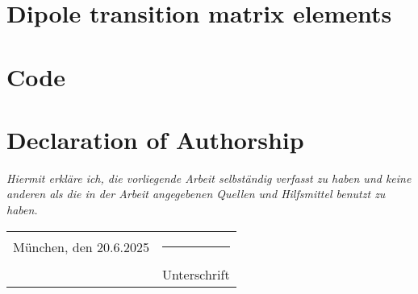 \documentclass[12pt, twoside]{report}
\begin{document}
\chapter{Dipole transition matrix elements}

\cleardoublepage


% 


% 


\chapter{Code}

\cleardoublepage




\cleardoublepage


\chapter*{Declaration of Authorship}
\emph{Hiermit erkläre ich, die vorliegende Arbeit selbständig verfasst zu haben und keine anderen als die in der Arbeit angegebenen Quellen und Hilfsmittel benutzt zu haben.}

\vspace{2cm}  
\noindent
\begin{tabular}{p{7cm} p{7cm}}
    München, den 20.6.2025 & \rule{6cm}{0.4pt} \\  
    & Unterschrift
\end{tabular}
\end{document}
